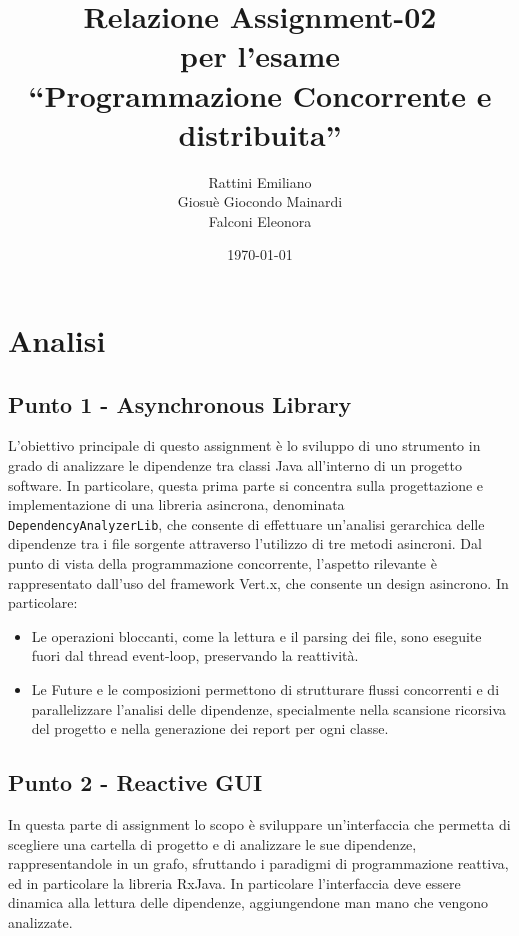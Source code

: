 \documentclass[a4paper,12pt]{report}
\title{Relazione Assignment-02 \\ per l'esame \\ ``Programmazione Concorrente e distribuita''}
\author{Rattini Emiliano\\Giosuè Giocondo Mainardi\\Falconi Eleonora}
\date{\today}
\begin{document}
    \maketitle

    \tableofcontents

    \chapter{Analisi}
    \section{Punto 1 - Asynchronous Library}

    L'obiettivo principale di questo assignment è lo sviluppo di uno strumento in grado di analizzare le dipendenze tra
    classi Java all'interno di un progetto software. In particolare, questa prima parte si concentra sulla progettazione
    e implementazione di una libreria asincrona, denominata \\ \texttt{DependencyAnalyzerLib}, che consente di effettuare
    un'analisi gerarchica delle dipendenze tra i file sorgente attraverso l'utilizzo di tre metodi asincroni.
    Dal punto di vista della programmazione concorrente, l’aspetto rilevante è rappresentato dall’uso del framework Vert.x,
    che consente un design asincrono. In particolare:
    \begin{itemize}
        \item Le operazioni bloccanti, come la lettura e il parsing dei file, sono eseguite fuori dal thread event-loop, preservando la reattività.
        \item Le Future e le composizioni permettono di strutturare flussi concorrenti e di parallelizzare l’analisi delle dipendenze, specialmente nella scansione ricorsiva del progetto e nella generazione dei report per ogni classe.
    \end{itemize}

    \section{Punto 2 - Reactive GUI}

    In questa parte di assignment lo scopo è sviluppare un'interfaccia che permetta di scegliere una cartella di progetto
    e di analizzare le sue dipendenze, rappresentandole in un grafo, sfruttando i paradigmi di programmazione reattiva,
    ed in particolare la libreria RxJava.
    In particolare l'interfaccia deve essere dinamica alla lettura delle dipendenze,
    aggiungendone man mano che vengono analizzate.
\end{document}
